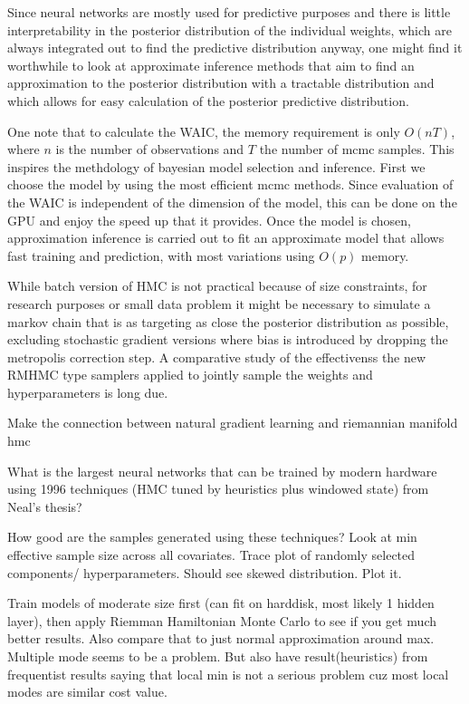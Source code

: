 \documentclass[12pt]{report}
\begin{document}
\begin{enumerate}
Since neural networks are 
mostly used for predictive purposes and there is little interpretability in the
posterior distribution of the individual weights, which are
always integrated out to find the predictive distribution anyway, one might find
it worthwhile to look at approximate inference methods that aim to find
an approximation to the posterior distribution with a tractable distribution and
which allows for easy calculation of the posterior predictive distribution. 

One note that to calculate the WAIC, the memory requirement is only $O(nT)$,
where $n$ is the number of observations and $T$ the number of mcmc samples. This
inspires the methdology of bayesian model selection and inference. First we
choose the model by using the most efficient mcmc methods. Since evaluation of
the WAIC is independent of the dimension of the model, this can be done on the
GPU and enjoy the speed up that it provides. Once the model is chosen,
approximation inference is carried out to fit an approximate model that allows
fast training and prediction, with most variations using $O(p)$ memory.

While batch version of HMC is not practical because of size constraints, for
research purposes or small data problem it might be necessary to simulate a
markov chain that is as targeting as close the posterior distribution as
possible, excluding stochastic gradient versions where bias is introduced by
dropping the metropolis correction step. A comparative study of the effectivenss the new
RMHMC type samplers applied to jointly sample the weights and hyperparameters is
long due. 

Make the connection between natural gradient learning and riemannian manifold
hmc



What is the largest neural networks that can be trained by modern hardware using 1996 techniques (HMC tuned by heuristics plus windowed state) from Neal's thesis?  

How good are the samples generated using these techniques? Look at min effective sample size across all covariates. Trace plot of randomly selected components/ hyperparameters. Should see skewed distribution. Plot it.


Train models of moderate size first (can fit on harddisk, most likely 1 hidden layer), then apply Riemman Hamiltonian Monte Carlo to see if you get much better results. Also compare that to just normal approximation around max. Multiple mode seems to be a problem. But also have result(heuristics) from frequentist results saying that local min is not a serious problem cuz most local modes are similar cost value. 


\end{enumerate}
\end{document}
